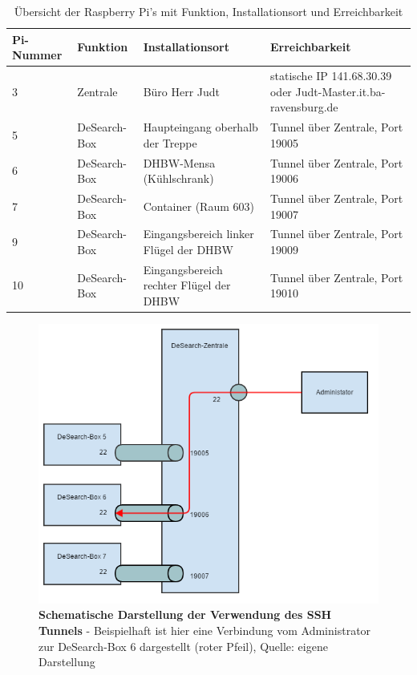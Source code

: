 \begin{table}[h]
	\begin{tabular}{ | p{} | p{} | p{4cm} | p{6cm} |}
		\hline
		\textbf{Pi-Nummer} & \textbf{Funktion} & \textbf{Installationsort} &  \textbf{Erreichbarkeit} \\ \hline
		3 & Zentrale & Büro Herr Judt & statische IP 141.68.30.39 oder \mbox{Judt-Master.it.ba-ravensburg.de} \\ \hline
		5 & DeSearch-Box & Haupteingang oberhalb der Treppe & Tunnel über Zentrale, Port 19005 \\ \hline
		6 & DeSearch-Box & DHBW-Mensa (Kühlschrank) & Tunnel über Zentrale, Port 19006 \\ \hline
		7 & DeSearch-Box & Container (Raum 603) & Tunnel über Zentrale, Port 19007 \\ \hline
		9 & DeSearch-Box & Eingangsbereich linker Flügel der DHBW & Tunnel über Zentrale, Port 19009 \\ \hline
		10 & DeSearch-Box & Eingangsbereich rechter Flügel der DHBW & Tunnel über Zentrale, Port 19010 \\ \hline
	\end{tabular}
	\caption{Übersicht der Raspberry Pi's mit Funktion, Installationsort und Erreichbarkeit}
	\label{tab:pis}
\end{table}

\begin{figure}
	\centering
	\includegraphics[width=\textwidth]{images/tunnel.png}
	\caption[Schematische Darstellung der Verwendung des SSH Tunnels]{\textbf{Schematische Darstellung der Verwendung des SSH Tunnels} - Beispielhaft ist hier eine Verbindung vom Administrator zur DeSearch-Box 6 dargestellt (roter Pfeil), Quelle: eigene Darstellung}
	\label{fig:tunnel}
\end{figure}


